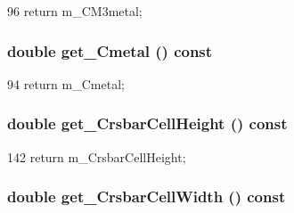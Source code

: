 \begin{DoxyCode}
96 { return m_CM3metal; }
\end{DoxyCode}
\hypertarget{classTechParameter_affa834a7dcca1f0db5bfdf6a52743cd4}{
\subsubsection[{get\_\-Cmetal}]{\setlength{\rightskip}{0pt plus 5cm}double get\_\-Cmetal () const}}
\label{classTechParameter_affa834a7dcca1f0db5bfdf6a52743cd4}



\begin{DoxyCode}
94 { return m_Cmetal; }
\end{DoxyCode}
\hypertarget{classTechParameter_a1bcb1c120a0445ea03c447abc8cd8f16}{
\subsubsection[{get\_\-CrsbarCellHeight}]{\setlength{\rightskip}{0pt plus 5cm}double get\_\-CrsbarCellHeight () const}}
\label{classTechParameter_a1bcb1c120a0445ea03c447abc8cd8f16}



\begin{DoxyCode}
142 { return m_CrsbarCellHeight; }
\end{DoxyCode}
\hypertarget{classTechParameter_a47d7ed7a25d1baec0ac3e63f883284a9}{
\subsubsection[{get\_\-CrsbarCellWidth}]{\setlength{\rightskip}{0pt plus 5cm}double get\_\-CrsbarCellWidth () const}}
\label{classTechParameter_a47d7ed7a25d1baec0ac3e63f883284a9}



